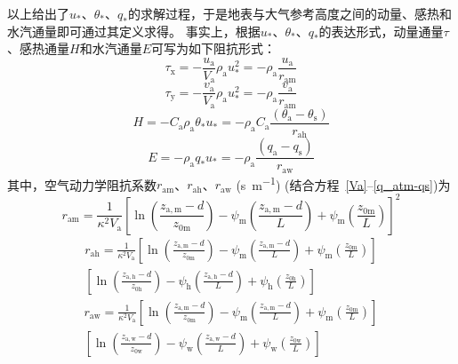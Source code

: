 以上给出了$u_\ast$、$\theta_\ast$、$q_\ast$的求解过程，于是地表与大气参考高度之间的动量、感热和水汽通量即可通过其定义求得。
事实上，根据$u_\ast$、$\theta_\ast$、$q_\ast$的表达形式，动量通量$\tau$、感热通量$H$和水汽通量$E$可写为如下阻抗形式：
\begin{equation}
  \tau_{\mathrm{x}}=-\frac{u_{\mathrm{a}}}{V_{\mathrm{a}}} \rho_{\mathrm{a}} u_{*}^{2}=-\rho_{\mathrm{a}} \frac{u_{\mathrm{a}}}{r_{\mathrm{a m}}}
\end{equation}
\begin{equation}
  \tau_{\mathrm{y}}=-\frac{v_{\mathrm{a}}}{V_{\mathrm{a}}} \rho_{\mathrm{a}} u_{*}^{2}=-\rho_{\mathrm{a}} \frac{v_{\mathrm{a}}}{r_{\mathrm{a m}}}
\end{equation}
\begin{equation}\label{SH}
  H=-C_{\mathrm{a}} \rho_{\mathrm{a}} \theta_{*} u_{\mathrm{*}}=-\rho_{\mathrm{a}} C_{\mathrm{a}} \frac{\left(\theta_{\mathrm{a}}-\theta_{\mathrm{s}}\right)}{r_{\mathrm{a h}}}
\end{equation}
\begin{equation}\label{LH}
  E=-\rho_{\mathrm{a}} q_{*} u_{*}=-\rho_{\mathrm{a}} \frac{\left(q_{\mathrm{a}}-q_{\mathrm{s}}\right)}{r_{\mathrm{a w}}}
\end{equation}
其中，空气动力学阻抗系数$r_{\mathrm{am}}$、$r_{\mathrm{ah}}$、$r_{\mathrm{aw}}$ (\unit{s.m^{-1}}) (结合方程~\eqref{Va}--\eqref{q_atm-qs})为
\begin{equation}\label{ram}
  r_{\mathrm{a m}}=\frac{1}{\kappa^{2} V_{\mathrm{a}}}\left[\ln \left(\frac{z_{\mathrm{a, m}}-d}{z_{\mathrm{0 m}}}\right)-\psi_{\mathrm{m}}\left(\frac{z_{\mathrm{a, m}}-d}{L}\right)+\psi_{\mathrm{m}}\left(\frac{z_{\mathrm{0 m}}}{L}\right)\right]^{2}
\end{equation}
\begin{equation}\label{rah}
  \begin{array}{c}r_{\mathrm{a h}}=\frac{1}{\kappa^{2} V_{\mathrm{a}}}\left[\ln \left(\frac{z_{\mathrm{a, m}}-d}{z_{\mathrm{0 m}}}\right)-\psi_{\mathrm{m}}\left(\frac{z_{\mathrm{a, m}}-d}{L}\right)+\psi_{\mathrm{m}}\left(\frac{z_{\mathrm{0 m}}}{L}\right)\right] \\ {\left[\ln \left(\frac{z_{\mathrm{a, h}}-d}{z_{\mathrm{0 h}}}\right)-\psi_{\mathrm{h}}\left(\frac{z_{\mathrm{a, h}}-d}{L}\right)+\psi_{\mathrm{h}}\left(\frac{z_{\mathrm{0 h}}}{L}\right)\right]}\end{array}
\end{equation}
\begin{equation}\label{raw}
  \begin{array}{c}r_{\mathrm{a w}}=\frac{1}{\kappa^{2} V_{\mathrm{a}}}\left[\ln \left(\frac{z_{\mathrm{a, m}}-d}{z_{\mathrm{0 m}}}\right)-\psi_{\mathrm{m}}\left(\frac{z_{\mathrm{a, m}}-d}{L}\right)+\psi_{\mathrm{m}}\left(\frac{z_{\mathrm{0 m}}}{L}\right)\right] \\ {\left[\ln \left(\frac{z_{\mathrm{a, w}}-d}{z_{\mathrm{0 w}}}\right)-\psi_{\mathrm{w}}\left(\frac{z_{\mathrm{a, w}}-d}{L}\right)+\psi_{\mathrm{w}}\left(\frac{z_{\mathrm{0 w}}}{L}\right)\right]}\end{array}
\end{equation}

